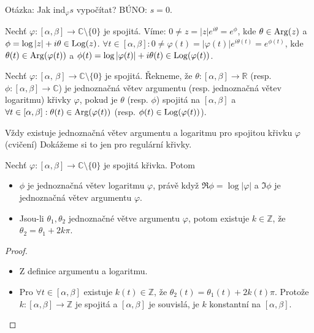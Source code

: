 \begin{note}
Otázka: Jak ind$_\varphi s$ vypočítat? BÚNO: $s=0$.
\end{note}

\begin{notation}
Nechť $\varphi: [\alpha, \beta] \rightarrow \mathbb{C} \setminus \{0\}$ je spojitá. Víme: $0 \neq z = |z|e^{i \theta}=e^{\phi}$, kde $\theta \in \operatorname*{Arg}(z)$ a $\phi = \log|z| + i \theta \in \operatorname*{Log}(z)$. $\forall t \in [\alpha, \beta]: 0 \neq \varphi(t)=|\varphi(t)|e^{i \theta(t)}=e^{ \phi(t)}$, kde $\theta(t) \in \operatorname*{Arg}(\varphi(t))$ a $\phi(t)=\log|\varphi(t)|+i \theta(t) \in \operatorname*{Log}(\varphi(t))$.
\end{notation}

\begin{definition}
Nechť $\varphi: [\alpha,\,\beta] \rightarrow \mathbb{C} \setminus \{0\}$ je spojitá. Řekneme, že $\theta: [\alpha, \beta] \rightarrow \mathbb{R}$ (resp. $\phi: [\alpha, \beta] \rightarrow \mathbb{C}$) je jednoznačná větev argumentu (resp. jednoznačná větev logaritmu) křivky $\varphi$, pokud je $\theta$ (resp. $\phi$) spojitá na $[\alpha, \beta]$ a $\forall t \in [\alpha, \beta]:  \theta(t) \in \operatorname*{Arg}(\varphi(t))$ (resp. $\phi(t) \in \operatorname*{Log}(\varphi(t))$).
\end{definition}

\begin{note}
Vždy existuje jednoznačná větev argumentu a logaritmu pro spojitou křivku $\varphi$ (cvičení) Dokážeme si to jen pro regulární křivky.
\end{note}

\begin{theorem}
Nechť $\varphi: [\alpha, \beta] \rightarrow \mathbb{C} \setminus \{0\}$ je spojitá křivka. Potom
\begin{itemize}
    \item $\phi$ je jednoznačná větev logaritmu $\varphi$, právě když $\Re \phi = \log|\varphi|$ a $\Im \phi$ je jednoznačná větev argumentu $\varphi$.
    \item Jsou-li $\theta_1, \theta_2$ jednoznačné větve argumentu $\varphi$, potom existuje $k \in \mathbb{Z}$, že $\theta_2=\theta_1 + 2 k \pi $.
\end{itemize}
\end{theorem}

\begin{proof}
\begin{itemize}
    \item Z definice argumentu a logaritmu.
    \item Pro $\forall t \in [\alpha, \beta]$ existuje $k (t) \in \mathbb{Z}$, že $\theta_2(t)=\theta_1(t) + 2 k(t) \pi$. Protože $k:  [\alpha, \beta] \rightarrow \mathbb{Z}$ je spojitá a $[\alpha, \beta]$ je souvislá, je $k$ konstantní na $[\alpha, \beta]$.
\end{itemize}
\end{proof}

